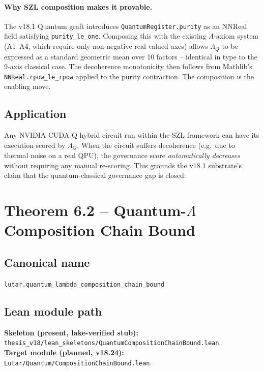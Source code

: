 \paragraph{Why SZL composition makes it provable.}
The v18.1 Quantum graft introduces \texttt{QuantumRegister.purity}
as an NNReal field satisfying \texttt{purity\_le\_one}.  Composing
this with the existing \(\Lambda\)-axiom system (A1--A4, which require only
non-negative real-valued axes) allows $\Lambda_Q$ to be expressed as
a standard geometric mean over 10 factors -- identical in type to the
9-axis classical case.  The decoherence monotonicity then follows
from Mathlib's \texttt{NNReal.rpow\_le\_rpow} applied to the purity
contraction. The composition is the enabling move.

\subsection*{Application}

Any NVIDIA CUDA-Q hybrid circuit run within the SZL framework can
have its execution scored by $\Lambda_Q$.  When the circuit suffers
decoherence (e.g.\ due to thermal noise on a real QPU), the governance
score \emph{automatically decreases} without requiring any manual
re-scoring.  This grounds the v18.1 substrate's claim that the
quantum-classical governance gap is closed.

\section{Theorem 6.2 -- Quantum-$\Lambda$ Composition Chain Bound}
\label{sec:thm02}

\subsection*{Canonical name}
\verb|lutar.quantum_lambda_composition_chain_bound|

\subsection*{Lean module path}
\textbf{Skeleton (present, lake-verified stub):}
\texttt{thesis\_v18/lean\_skeletons/QuantumCompositionChainBound.lean}.\\
\textbf{Target module (planned, v18.24):}
\texttt{Lutar/Quantum/CompositionChainBound.lean}.


